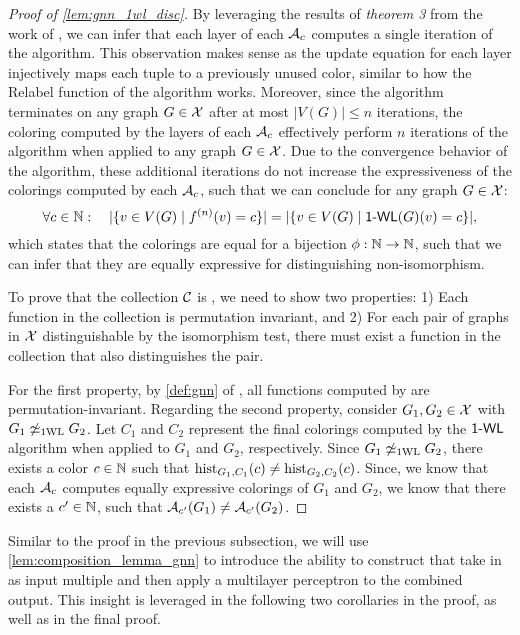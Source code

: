 \begin{proof}[Proof of \cref{lem:gnn_1wl_disc}]
    By leveraging the results of \textit{theorem 3} from the work of \cite{Xu2018}, we can infer that each layer of each $\mathcal{A}_c$ computes a single iteration of the \wl algorithm. This observation makes sense as the update equation for each layer injectively maps each tuple to a previously unused color, similar to how the \textsf{Relabel} function of the \wl algorithm works. Moreover, since the \wl algorithm terminates on any graph $G \in \mathcal{X}$ after at most $|V(G)| \leq n$ iterations, the coloring computed by the layers of each $\mathcal{A}_c$ effectively perform $n$ iterations of the \wl algorithm when applied to any graph $G \in \mathcal{X}$. Due to the convergence behavior of the \wl algorithm, these additional iterations do not increase the expressiveness of the colorings computed by each $\mathcal{A}_c$, such that we can conclude for any graph $G \in \mathcal{X}$:
    \begin{equation*}
       \forall c \in \mathbb{N}: \quad |\{ v \in V(G) \mid  f^{(n)}(v) = c \}| = |\{ v \in V(G) \mid  \textsf{1-WL}(G)(v) = c \}|,
    \end{equation*}
    which states that the colorings are equal for a bijection $\phi : \mathbb{N} \rightarrow \mathbb{N}$, such that we can infer that they are equally expressive for distinguishing non-isomorphism.

    To prove that the collection $\mathcal{C}$ is \wldisc, we need to show two properties: 1) Each function in the collection is permutation invariant, and 2) For each pair of graphs in $\mathcal{X}$ distinguishable by the \wl isomorphism test, there must exist a function in the collection that also distinguishes the pair.
   
    For the first property, by \cref{def:gnn} of \gnns, all functions computed by \gnns are permutation-invariant.
    Regarding the second property, consider $G_1, G_2 \in \mathcal{X}$ with $G_1 \not\simeq_{\text{1WL}} G_2$. Let $C_1$ and $C_2$ represent the final colorings computed by the $\textsf{1-WL}$ algorithm when applied to $G_1$ and $G_2$, respectively. Since $G_1 \not\simeq_{\text{1WL}} G_2$, there exists a color $c \in \mathbb{N}$ such that $\operatorname{hist}_{G_1,C_1}(c) \neq \operatorname{hist}_{G_2,C_2}(c)$. Since, we know that each $\mathcal{A}_c$ computes equally expressive colorings of $G_1$ and $G_2$, we know that there exists a $c' \in \mathbb{N}$, such that $\mathcal{A}_{c'}(G_1) \neq \mathcal{A}_{c'}(G_2)$.
\end{proof}
 
Similar to the proof in the previous subsection, we will use \cref{lem:composition_lemma_gnn} to introduce the ability to construct \gnns that take in as input multiple \gnns and then apply a multilayer perceptron to the combined output. This insight is leveraged in the following two corollaries in the proof, as well as in the final proof.

